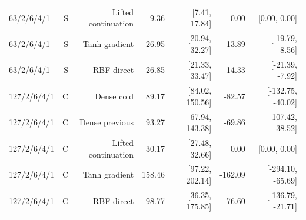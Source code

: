\documentclass[11pt,letterpaper]{article}
\theoremstyle{definition}
\newcommand{\1}{\mathbf 1}
\begin{document}
\begin{table}[tbp]
\begin{tabular}{lrrrrrr}
63/2/6/4/1 & S & Lifted continuation & 9.36 & [7.41, 17.84] & 0.00 & [0.00, 0.00]\\
63/2/6/4/1 & S & Tanh gradient & 26.95 & [20.94, 32.27] & -13.89 & [-19.79, -8.56]\\
63/2/6/4/1 & S & RBF direct & 26.85 & [21.33, 33.47] & -14.33 & [-21.39, -7.92]\\
127/2/6/4/1 & C & Dense cold & 89.17 & [84.02, 150.56] & -82.57 & [-132.75, -40.02]\\
127/2/6/4/1 & C & Dense previous & 93.27 & [67.94, 143.38] & -69.86 & [-107.42, -38.52]\\
127/2/6/4/1 & C & Lifted continuation & 30.17 & [27.48, 32.66] & 0.00 & [0.00, 0.00]\\
127/2/6/4/1 & C & Tanh gradient & 158.46 & [97.22, 202.14] & -162.09 & [-294.10, -65.69]\\
127/2/6/4/1 & C & RBF direct & 98.77 & [36.35, 175.85] & -76.60 & [-136.79, -21.71]\\
\bottomrule
\end{tabular}
\end{table}
\end{document}
